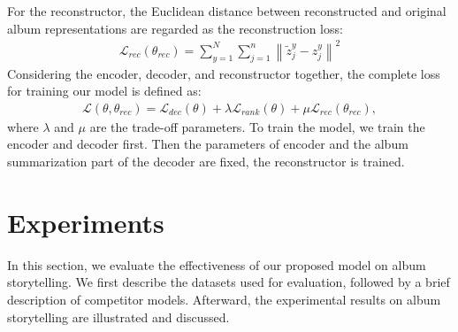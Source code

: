 \documentclass[letterpaper]{article} \usepackage{aaai19}  \usepackage{times}  \usepackage{helvet}  \usepackage{courier}  \usepackage{url}  \usepackage{graphicx}  \usepackage{color}
\begin{document}
For the reconstructor, the Euclidean distance between reconstructed and original album representations are regarded as the reconstruction loss:
\begin{align}
	\label{eq:recons_loss}
    \mathcal{L}_{rec}(\theta_{rec}) = \sum_{y=1}^{N}\sum_{j=1}^{n} \left\| \tilde{z}_j^y - z_j^y \right\|^{2}
\end{align}
Considering the encoder, decoder, and reconstructor together, the complete loss for training our model is defined as:
\begin{align}
\label{eq:final_loss_2}
    \mathcal{L}(\theta, \theta_{rec}) = \mathcal{L}_{dec}(\theta) + \lambda \mathcal{L}_{rank}(\theta) + \mu \mathcal{L}_{rec}(\theta_{rec}),
\end{align}
where $\lambda$ and $\mu$ are the trade-off parameters. To train the model, we train the encoder and decoder first. Then the parameters of encoder and the album summarization part of the decoder are fixed, the reconstructor is trained.





\section{Experiments}

In this section, we evaluate the effectiveness of our proposed model on album storytelling. We first describe the datasets used for evaluation, followed by a brief description of competitor models. Afterward, the experimental results on album storytelling are illustrated and discussed.
\end{document}
